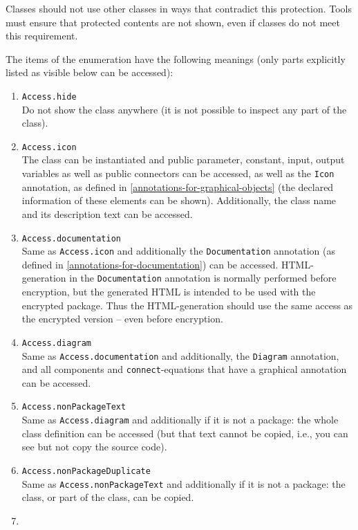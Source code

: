 \begin{annotationdefinition*}[access]
\begin{semantics}
Classes should not use other classes in ways that contradict this protection.
Tools must ensure that protected contents are not shown, even if classes do not meet this requirement.

The items of the  enumeration have the following meanings (only parts explicitly listed as visible below can be accessed):
\begin{enumerate}
\item
  \lstinline!Access.hide!\\
  Do not show the class anywhere (it is not possible to inspect any part of the class).
\item
  \lstinline!Access.icon!\\
  The class can be instantiated and public parameter, constant, input, output variables as well as public connectors can be accessed, as well as the \lstinline!Icon! annotation, as defined in \cref{annotations-for-graphical-objects} (the declared information of these elements can be shown).
  Additionally, the class name and its description text can be accessed.
\item
  \lstinline!Access.documentation!\\
  Same as \lstinline!Access.icon! and additionally the \lstinline!Documentation! annotation (as defined in \cref{annotations-for-documentation}) can be accessed.
  HTML-generation in the \lstinline!Documentation! annotation is normally performed before encryption, but the generated HTML is intended to be used with the encrypted package.
  Thus the HTML-generation should use the same access as the encrypted version -- even before encryption.
\item
  \lstinline!Access.diagram!\\
  Same as \lstinline!Access.documentation! and additionally, the \lstinline!Diagram! annotation, and all components and \lstinline!connect!-equations that have a graphical annotation can be accessed.
\item
  \lstinline!Access.nonPackageText!\\
  Same as \lstinline!Access.diagram! and additionally if it is not a package: the whole class definition can be accessed (but that text cannot be copied, i.e., you can see but not copy the source code).
\item
  \lstinline!Access.nonPackageDuplicate!\\
  Same as \lstinline!Access.nonPackageText! and additionally if it is not a package: the class, or part of the class, can be copied.
\item

\end{enumerate}
\end{semantics}
\end{annotationdefinition*}
